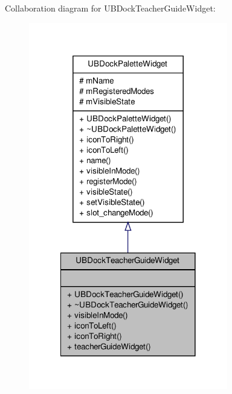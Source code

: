 Collaboration diagram for U\-B\-Dock\-Teacher\-Guide\-Widget\-:
\nopagebreak
\begin{figure}[H]
\begin{center}
\leavevmode
\includegraphics[width=246pt]{d9/df5/class_u_b_dock_teacher_guide_widget__coll__graph}
\end{center}
\end{figure}
